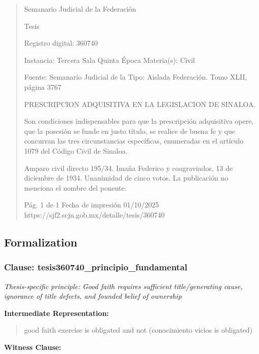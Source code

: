 \documentclass[11pt,a4paper]{article}
\begin{document}
\begin{quote}
                                                   Semanario Judicial de la Federación

                                                  Tesis

 Registro digital: 360740

 Instancia: Tercera Sala          Quinta Época                         Materia(s): Civil

                                  Fuente: Semanario Judicial de la     Tipo: Aislada
                                  Federación.
                                  Tomo XLII, página 3767


PRESCRIPCION ADQUISITIVA EN LA LEGISLACION DE SINALOA.


Son condiciones indispensables para que la prescripción adquisitiva opere, que la posesión se
funde en justo título, se realice de buena fe y que concurran las tres circunstancias específicas,
enumeradas en el artículo 1079 del Código Civil de Sinaloa.


Amparo civil directo 195/34. Imaña Federico y coagraviados. 13 de diciembre de 1934. Unanimidad
de cinco votos. La publicación no menciona el nombre del ponente.




                                             Pág. 1 de 1             Fecha de impresión 01/10/2025
  https://sjf2.scjn.gob.mx/detalle/tesis/360740

\end{quote}

\subsection{Formalization}

\subsubsection{Clause: tesis360740\_principio\_fundamental}

\textit{Thesis-specific principle: Good faith requires sufficient title/generating cause, ignorance of title defects, and founded belief of ownership}

\textbf{Intermediate Representation:}

\begin{quote}
good faith exercise is obligated and not (conocimiento vicios is obligated)
\end{quote}

\textbf{Witness Clause:}
\end{document}
